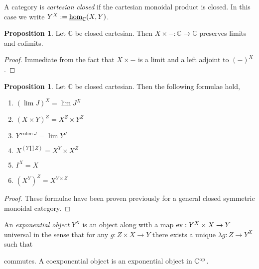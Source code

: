 \documentclass[12pt]{extarticle}
\DeclareMathOperator{\colim}{\mathrm{colim}}
\newcommand{\id}{\mathrm{id}}
\theoremstyle{definition}
\newtheorem{proposition}[theorem]{Proposition}
\newenvironment{definition}[1][Definition:]{\begin{trivlist}
\item[\hskip \labelsep {\bfseries #1}]}{\end{trivlist}}
\newcommand{\C}{\mathbb{C}}
\begin{document}
\begin{definition}
A category is \textit{cartesian closed} if the cartesian monoidal product is closed. In this case we write $Y^X := \inthom{\C}{X}{Y}$.
\end{definition}

\begin{proposition}
Let $\C$ be closed cartesian. Then $X \times - : \C \to \C$ preserves limits and colimits.
\end{proposition}

\begin{proof}
Immediate from the fact that $X \times -$ is a limit and a left adjoint to $(-)^X$. 
\end{proof}

\begin{proposition}
Let $\C$ be closed cartesian. Then the following formulae hold,
\begin{enumerate}
\item $(\lim J)^X = \lim J^X$
\item $(X \times Y)^Z = X^Z \times Y^Z$
\item $Y^{\colim J} = \lim Y^J$
\item $X^{(Y \coprod Z)} = X^Y \times X^Z$
\item $I^X = X$
\item $(X^Y)^Z = X^{Y \times Z}$
\end{enumerate}
\end{proposition}

\begin{proof}
These formulae have been proven previously for a general closed symmetric monoidal category.
\end{proof}

\begin{definition}
An \textit{exponential object} $Y^X$ is an object along with a map $\mathrm{ev} : Y^X \times X \to Y$ universal in the sense that for any $g : Z \times X \to Y$ there exists a unique $\lambda g : Z \to Y^X$ such that
\begin{center}
\end{center}
commutes. A coexponential object is an exponential object in $\C^\op$.
\end{definition}
\end{document}
